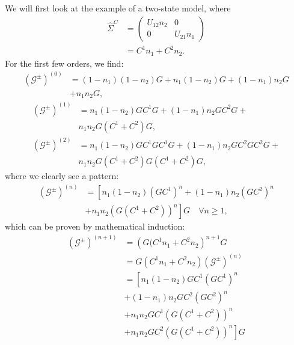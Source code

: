 \documentclass{article}
\begin{document}
\begin{multicols}{2}
        
        We will first look at the example of a two-state model, where \begin{align}
        \hat{\Sigma}^C &= \begin{pmatrix} U_{12}n_2 & 0 \\ 0 & U_{21} n_1\end{pmatrix}\nonumber\\&=C^1 n_1 + C^2 n_2.
        \end{align}
        For the first few orders, we find:
        \begin{align*}
            \left(\mathscr{G}^\pm\right)^{(0)} &= (1-n_1)(1-n_2)G + n_1(1-n_2)G + (1-n_1) n_2 G \\&+ n_1 n_2 G,  
        \end{align*}
        \begin{align*}
            \left(\mathscr{G}^\pm\right)^{(1)} &=  n_1(1-n_2)GC^1 G + (1-n_1) n_2 G C^2 G +\\& n_1 n_2 G \left(C^1+C^2\right) G, \\
            \left(\mathscr{G}^\pm\right)^{(2)} &=  n_1(1-n_2)GC^1 GC^1 G + (1-n_1) n_2 G C^2 GC^2 G +\\& n_1 n_2 G \left(C^1+C^2\right) G\left(C^1+C^2\right) G, 
        \end{align*}
        where we clearly see a pattern:
        \begin{align*}
            \left(\mathscr{G}^\pm\right)^{(n)} &= \left[n_1 (1-n_2) \left(G C^1\right)^n + (1-n_1) n_2 \left(GC^2\right)^n\right. \\ & \left. + n_1 n_2 \left(G (C^1 +C^2)\right)^n\right] G \quad \forall n \geq 1,
        \end{align*}
        which can be proven by mathematical induction:
        \begin{align*}
        \left(\mathscr{G}^\pm\right)^{(n+1)} &= \left( G (C^1 n_1 + C^2 n_2\right)^{n+1} G \\
        &= G (C^1 n_1 + C^2 n_2 )\left(\mathscr{G}^\pm\right)^{(n)} \\
        &= \left[ n_1 (1-n_2) G C^1 (GC^1)^n \right. \\ &+ (1-n_1) n_2 G C^2(GC^2)^n \\ &+ n_1 n_2 GC^1 (G (C^1+C^2))^n \\ &\left.+ n_1 n_2 GC^2 (G (C^1+C^2))^n \right] G
        \end{align*}
        

\end{multicols}
\end{document}
